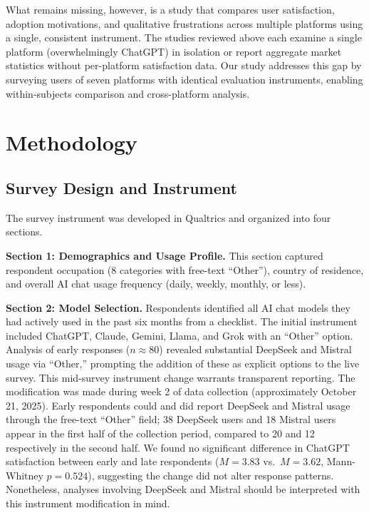 \documentclass[10pt,twocolumn]{article}
\begin{document}
What remains missing, however, is a study that compares user satisfaction, adoption motivations, and qualitative frustrations across multiple platforms using a single, consistent instrument. The studies reviewed above each examine a single platform (overwhelmingly ChatGPT) in isolation or report aggregate market statistics without per-platform satisfaction data. Our study addresses this gap by surveying users of seven platforms with identical evaluation instruments, enabling within-subjects comparison and cross-platform analysis.


\section{Methodology}

\subsection{Survey Design and Instrument}

The survey instrument was developed in Qualtrics and organized into four sections.

\textbf{Section 1: Demographics and Usage Profile.} This section captured respondent occupation (8 categories with free-text ``Other''), country of residence, and overall AI chat usage frequency (daily, weekly, monthly, or less).

\textbf{Section 2: Model Selection.} Respondents identified all AI chat models they had actively used in the past six months from a checklist. The initial instrument included ChatGPT, Claude, Gemini, Llama, and Grok with an ``Other'' option. Analysis of early responses ($n \approx 80$) revealed substantial DeepSeek and Mistral usage via ``Other,'' prompting the addition of these as explicit options to the live survey. This mid-survey instrument change warrants transparent reporting. The modification was made during week 2 of data collection (approximately October 21, 2025). Early respondents could and did report DeepSeek and Mistral usage through the free-text ``Other'' field; 38 DeepSeek users and 18 Mistral users appear in the first half of the collection period, compared to 20 and 12 respectively in the second half. We found no significant difference in ChatGPT satisfaction between early and late respondents ($M=3.83$ vs.\ $M=3.62$, Mann-Whitney $p=0.524$), suggesting the change did not alter response patterns. Nonetheless, analyses involving DeepSeek and Mistral should be interpreted with this instrument modification in mind.
\end{document}
